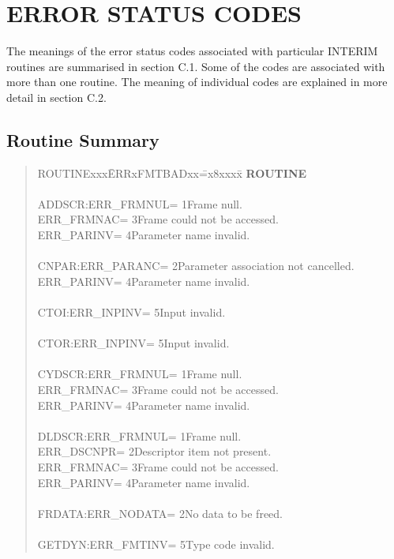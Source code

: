 \documentclass{article}
\begin{document}
\section {ERROR STATUS CODES}
The meanings of the error status codes associated with particular INTERIM
routines are summarised in section C.1.
Some of the codes are associated with more than one routine.
The meaning of individual codes are explained in more detail in section C.2.
\subsection {Routine Summary}
\begin{quote}
\begin{tabbing}
ROUTINExxx\=ERRxFMTBADxx\==x8xxxx\=\kill
{\bf ROUTINE}\>\\
\\
ADDSCR:\>ERR\_FRMNUL\>= 1\>Frame null.\\
\>ERR\_FRMNAC\>= 3\>Frame could not be accessed.\\
\>ERR\_PARINV\>= 4\>Parameter name invalid.\\
\\
CNPAR:\>ERR\_PARANC\>= 2\>Parameter association not cancelled.\\
\>ERR\_PARINV\>= 4\>Parameter name invalid.\\
\\
CTOI:\>ERR\_INPINV\>= 5\>Input invalid.\\
\\
CTOR:\>ERR\_INPINV\>= 5\>Input invalid.\\
\\
CYDSCR:\>ERR\_FRMNUL\>= 1\>Frame null.\\
\>ERR\_FRMNAC\>= 3\>Frame could not be accessed.\\
\>ERR\_PARINV\>= 4\>Parameter name invalid.\\
\\
DLDSCR:\>ERR\_FRMNUL\>= 1\>Frame null.\\
\>ERR\_DSCNPR\>= 2\>Descriptor item not present.\\
\>ERR\_FRMNAC\>= 3\>Frame could not be accessed.\\
\>ERR\_PARINV\>= 4\>Parameter name invalid.\\
\\
FRDATA:\>ERR\_NODATA\>= 2\>No data to be freed.\\
\\
GETDYN:\>ERR\_FMTINV\>= 5\>Type code invalid.\\

\end{tabbing}
\end{quote}
\end{document}
